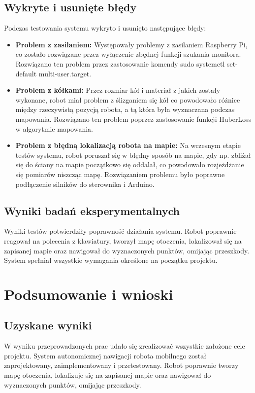 \documentclass[a4paper,twoside,12pt]{book}
\begin{document}
\section{Wykryte i usunięte błędy}
Podczas testowania systemu wykryto i usunięto następujące błędy:
\begin{itemize}
	\item \textbf{Problem z zasilaniem:} Występowały problemy z zasilaniem Raspberry Pi, co zostało rozwiązane przez wyłączenie zbędnej funkcji szukania monitora. Rozwiązano ten problem przez zastosowanie komendy sudo systemctl set-default multi-user.target.
	\item \textbf{Problem z kółkami:} Przez rozmiar kół i materiał z jakich zostały wykonane, robot miał problem z ślizganiem się kół co powodowało różnice między rzeczywistą pozycją robota, a tą która była wyznaczana podczas mapowania. Rozwiązano ten problem poprzez zastosowanie funkcji HuberLoss w algorytmie mapowania.
	\item \textbf{Problem z błędną lokalizacją robota na mapie:} Na wczesnym etapie testów systemu, robot poruszał się w błędny sposób na mapie, gdy np. zbliżał się do ściany na mapie początkowo się oddalał, co powodowało rozjeżdżanie się pomiarów niszcząc mapę. Rozwiązaniem problemu było poprawne podłączenie silników do sterownika i Arduino.
\end{itemize}

\section{Wyniki badań eksperymentalnych}
Wyniki testów potwierdziły poprawność działania systemu. Robot poprawnie reagował na polecenia z klawiatury, tworzył mapę otoczenia, lokalizował się na zapisanej mapie oraz nawigował do wyznaczonych punktów, omijając przeszkody. System spełniał wszystkie wymagania określone na początku projektu.






\chapter{Podsumowanie i wnioski}



\section{Uzyskane wyniki}
W wyniku przeprowadzonych prac udało się zrealizować wszystkie założone cele projektu. System autonomicznej nawigacji robota mobilnego został zaprojektowany, zaimplementowany i przetestowany. Robot poprawnie tworzy mapę otoczenia, lokalizuje się na zapisanej mapie oraz nawigował do wyznaczonych punktów, omijając przeszkody. 
\end{document}

